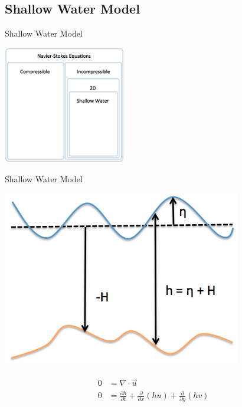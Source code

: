 \documentclass{beamer}
\begin{document}
		\subsection{Shallow Water Model}
			\begin{frame}[t]{Shallow Water Model}
				\begin{center}
					\includegraphics[width=0.4\textwidth]{nested_models_sw.png}
				\end{center}
			\end{frame}
			\begin{frame}[t]{Shallow Water Model}
				\begin{center}
					\begin{minipage}{0.45\textwidth}
						\includegraphics[width=\textwidth]{sw_diagram.png}
					\end{minipage}
					\begin{minipage}{0.45\textwidth}
						\begin{align*}
							0 &=\nabla \cdot \vec u\\
							0 &=\frac{\partial h}{\partial t} + \frac{\partial}{\partial x}(hu) + \frac{\partial}{\partial y}(hv)
						\end{align*}
					\end{minipage}
				\end{center}
			\end{frame}
\end{document}
